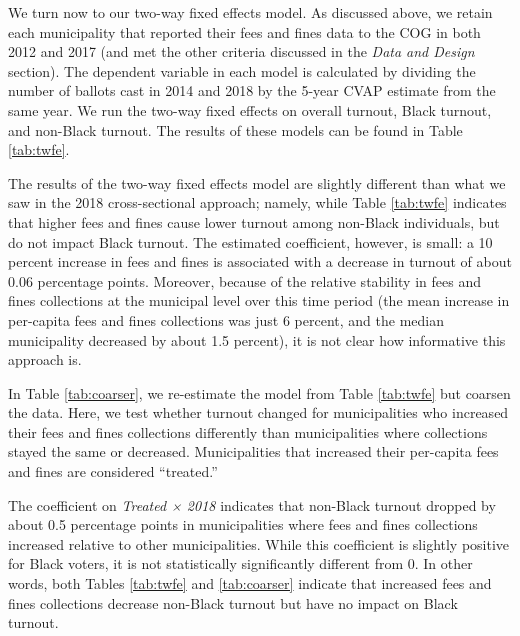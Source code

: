 \documentclass[
  12pt,
]{article}
\begin{document}
We turn now to our two-way fixed effects model. As discussed above, we retain each municipality that reported their fees and fines data to the COG in both 2012 and 2017 (and met the other criteria discussed in the \emph{Data and Design} section). The dependent variable in each model is calculated by dividing the number of ballots cast in 2014 and 2018 by the 5-year CVAP estimate from the same year. We run the two-way fixed effects on overall turnout, Black turnout, and non-Black turnout. The results of these models can be found in Table \ref{tab:twfe}.

\begin{singlespace}

\end{singlespace}

The results of the two-way fixed effects model are slightly different than what we saw in the 2018 cross-sectional approach; namely, while Table \ref{tab:twfe} indicates that higher fees and fines cause lower turnout among non-Black individuals, but do not impact Black turnout. The estimated coefficient, however, is small: a 10 percent increase in fees and fines is associated with a decrease in turnout of about 0.06 percentage points. Moreover, because of the relative stability in fees and fines collections at the municipal level over this time period (the mean increase in per-capita fees and fines collections was just 6 percent, and the median municipality decreased by about 1.5 percent), it is not clear how informative this approach is.

In Table \ref{tab:coarser}, we re-estimate the model from Table \ref{tab:twfe} but coarsen the data. Here, we test whether turnout changed for municipalities who increased their fees and fines collections differently than municipalities where collections stayed the same or decreased. Municipalities that increased their per-capita fees and fines are considered ``treated.''

\begin{singlespace}

\end{singlespace}

The coefficient on \emph{Treated × 2018} indicates that non-Black turnout dropped by about 0.5 percentage points in municipalities where fees and fines collections increased relative to other municipalities. While this coefficient is slightly positive for Black voters, it is not statistically significantly different from 0. In other words, both Tables \ref{tab:twfe} and \ref{tab:coarser} indicate that increased fees and fines collections decrease non-Black turnout but have no impact on Black turnout.
\end{document}
